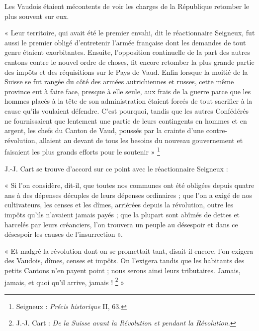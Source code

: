 \documentclass[french,twoside]{book} %
\newenvironment{quoteblock}%
  {\begin{quoting}}
  {\end{quoting}}
\newenvironment{quotebar}{%
    \def\FrameCommand{{\color{rubric!10!}\vrule width 0.5em} \hspace{0.9em}}%
    \def\OuterFrameSep{\itemsep} %
    \MakeFramed {\advance\hsize-\width \FrameRestore}
  }%
  {%
    \endMakeFramed
  }
\renewenvironment{quoteblock}%
  {%
    \savenotes
    \setstretch{0.9}
    \begin{quotebar}
  }
  {%
    \end{quotebar}
    \spewnotes
  }
\begin{document}
\noindent Les Vaudois étaient mécontents de voir les charges de la République retomber le plus souvent sur eux.\par

\begin{quoteblock}
 \noindent « Leur territoire, qui avait été le premier envahi, dit le réactionnaire Seigneux, fut aussi le premier obligé d’entretenir l’armée française dont les demandes de tout genre étaient exorbitantes. Ensuite, l’opposition continuelle de la part des autres cantons contre le nouvel ordre de choses, fit encore retomber la plus grande partie des impôts et des réquisitions sur le Pays de Vaud. Enfin lorsque la moitié de la Suisse se fut rangée du côté des armées autrichiennes et russes, cette même province eut à faire face, presque à elle seule, aux frais de la guerre parce que les hommes placés à la tête de son administration étaient forcés de tout sacrifier à la cause qu’ils voulaient défendre. C’est pourquoi, tandis que les autres Confédérés ne fournissaient que lentement une partie de leurs contingents en hommes et en argent, les chefs du Canton de Vaud, poussés par la crainte d’une contre-révolution, allaient au devant de tous les besoins du nouveau gouvernement et faisaient les plus grands efforts pour le soutenir » \footnote{Seigneux : \emph{Précis historique} II, 63.} 
 \end{quoteblock}

\noindent J.-J. Cart se trouve d’accord sur ce point avec le réactionnaire Seigneux :\par

\begin{quoteblock}
 \noindent « Si l’on considère, dit-il, que toutes nos communes ont été obligées depuis quatre ans à des dépenses décuples de leurs dépenses ordinaires ; que l’on a exigé de nos cultivateurs, les censes et les dîmes, arriérées depuis la révolution, outre les impôts qu’ils n’avaient jamais payés ; que la plupart sont abîmés de dettes et harcelés par leurs créanciers, l’on trouvera un peuple au désespoir et dans ce désespoir les causes de l’insurrection ».\par
 « Et malgré la révolution dont on se promettait tant, disait-il encore, l’on exigera des Vaudois, dîmes, censes et impôts. On l’exigera tandis que les habitants des petits Cantons n’en payent point ; nous serons ainsi leurs tributaires. Jamais, jamais, et quoi qu’il arrive, jamais ! \footnote{J.-J. Cart : \emph{De la Suisse avant la Révolution et pendant la Révolution.}} »
 \end{quoteblock}
\end{document}
